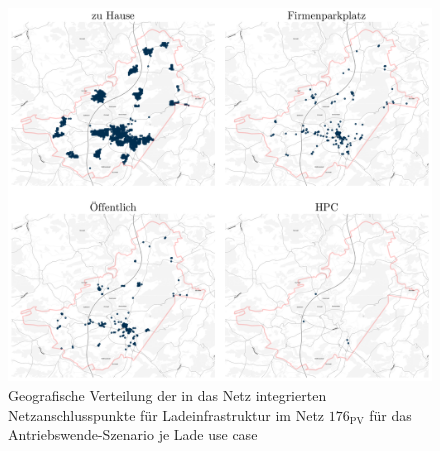 \begin{figure}[H]
    \centering
    \includegraphics[width=\textwidth]{Bilder/cps_in_grid_176}
    \caption[Geo­gra­fische Verteilung der in das Netz integrierten Netzanschlusspunkte für Ladeinfrastruktur im Netz \num{176} für das Antriebswende-Szenario je Lade use case]{Geo­gra­fische Verteilung der in das Netz integrierten Netzanschlusspunkte für Ladeinfrastruktur im Netz \(176_{\text{PV}}\) für das Antriebswende-Szenario je Lade use case}\label{fig:cps_in_grid}
\end{figure}